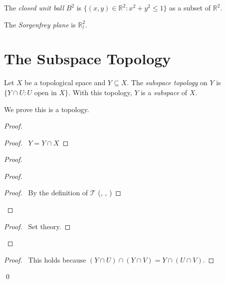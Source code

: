 \begin{df}
  The \emph{closed unit ball} $B^2$ is $\{ (x, y) \in \mathbb{R}^2 : x^2 +
  y^2 \leq 1 \}$ as a subset of $\mathbb{R}^2$.
\end{df}

 \begin{df}
 The \emph{Sorgenfrey plane} is $\mathbb{R}_l^2$.
\end{df}

\section{The Subspace Topology}

\begin{df}
  Let $X$ be a topological space and $Y \subseteq X$. The \emph{subspace
    topology} on $Y$ is $\{ Y \cap U : U \text{ open in } X \}$. With this
  topology, $Y$ is a \emph{subspace} of $X$.

  We prove this is a topology.
\end{df}

\begin{proof}
  \pf
  \begin{proof}
    \pf\ $Y = Y \cap X$
  \end{proof}
  \begin{proof}
    \begin{proof}
      \begin{proof}
        \pf\ By the definition of $\mathcal{T}$ (,
        ,
        )
      \end{proof}
    \end{proof}
    \begin{proof}
      \pf\ Set theory.
    \end{proof}
  \end{proof}
  \begin{proof}
    \pf\ This holds because $(Y \cap U) \cap (Y \cap V) = Y \cap (U \cap V)$.
  \end{proof}
  \qed
\end{proof}

